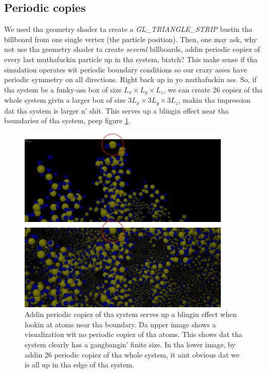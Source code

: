 \subsection{Periodic copies}
We used tha geometry shader ta create a \textit{GL\_TRIANGLE\_STRIP} bustin tha billboard from one single vertex (the particle position). Then, one may ask, why not use tha geometry shader ta create \textit{several} billboards, addin periodic copiez of every last muthafuckin particle up in tha system, biatch? This make sense if tha simulation operates wit periodic boundary conditions so our crazy asses have periodic symmetry on all directions. Right back up in yo muthafuckin ass. So, if tha system be a funky-ass box of size $L_x\times L_y \times L_z$, we can create 26 copiez of tha whole system givin a larger box of size $3L_x\times 3L_y\times 3L_z$, makin tha impression dat tha system is larger n' shit. This serves up a blingin effect near tha boundariez of tha system, peep figure \ref{fig:visualization_billboard_periodic_copies}.
\begin{figure}[htb]
\begin{center}
\includegraphics[width=0.9\textwidth, trim=0cm 0cm 0cm 0cm, clip]{visualization/figures/periodic_copies.png}
\end{center}
\caption{Addin periodic copiez of tha system serves up a blingin effect when lookin at atoms near tha boundary. Da upper image shows a visualization wit no periodic copiez of tha atoms. This shows dat tha system clearly has a gangbangin' finite size. In tha lower image, by addin 26 periodic copiez of tha whole system, it aint obvious dat we is all up in tha edge of tha system.}
\label{fig:visualization_billboard_periodic_copies}
\end{figure}
